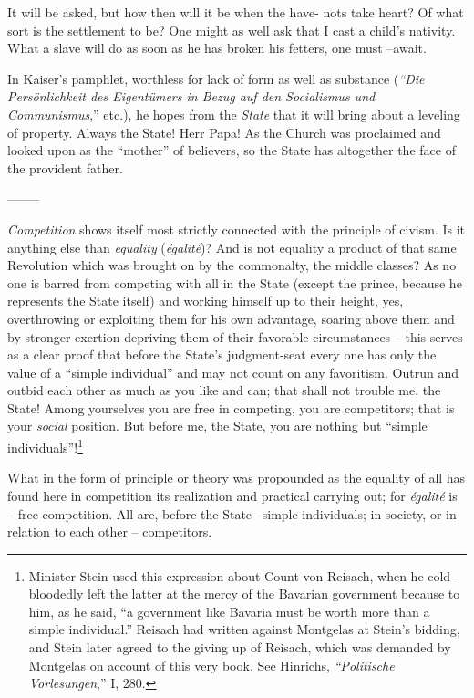\documentclass[12pt,a4paper]{book}
\begin{document}
It will be asked, but how then will it be when the have- nots take heart? Of 
what sort is the settlement to be? One might as well ask that I cast a child's 
nativity. What a slave will do as soon as he has broken his fetters, one must 
--await.

In Kaiser's pamphlet, worthless for lack of form as well as substance 
(\textit{``Die Pers\"onlichkeit des Eigent\"umers in Bezug auf den 
Socialismus und Communismus},'' etc.), he hopes from the \textit{State} that 
it will bring about a leveling of property. Always the State! Herr Papa! As 
the Church was proclaimed and looked upon as the ``mother'' of believers, so 
the State has altogether the face of the provident father.

\begin{center}
--------\end{center}


\textit{Competition} shows itself most strictly connected with the principle 
of civism. Is it anything else than \textit{equality} (\textit{\'egalit\'e})? 
And is not equality a product of that same Revolution which was brought on by 
the commonalty, the middle classes? As no one is barred from competing with 
all in the State (except the prince, because he represents the State itself) 
and working himself up to their height, yes, overthrowing or exploiting them 
for his own advantage, soaring above them and by stronger exertion depriving 
them of their favorable circumstances -- this serves as a clear proof that 
before the State's judgment-seat every one has only the value of a ``simple 
individual'' and may not count on any favoritism. Outrun and outbid each 
other as much as you like and can; that shall not trouble me, the State! Among 
yourselves you are free in competing, you are competitors; that is your 
\textit{social} position. But before me, the State, you are nothing but 
``simple individuals''!\footnote{Minister Stein used this expression about 
Count von Reisach, when he cold-bloodedly left the latter at the mercy of the 
Bavarian government because to him, as he said, ``a government like Bavaria 
must be worth more than a simple individual.'' Reisach had written against 
Montgelas at Stein's bidding, and Stein later agreed to the giving up of 
Reisach, which was demanded by Montgelas on account of this very book. See 
Hinrichs, \textit{``Politische Vorlesungen},'' I, 280.}

What in the form of principle or theory was propounded as the equality of all 
has found here in competition its realization and practical carrying out; for 
\textit{\'egalit\'e} is -- free competition. All are, before the State 
--simple individuals; in society, or in relation to each other -- competitors.
\end{document}
